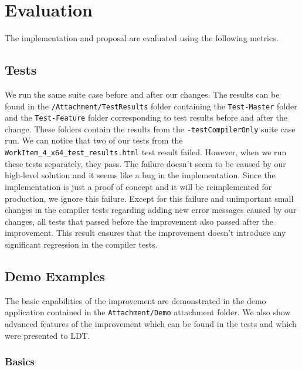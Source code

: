 \chapter{Evaluation}

The implementation and proposal are evaluated using the following metrics.

\section{Tests}

We run the same suite case before and after our changes. 
The results can be found in the \texttt{/Attachment/TestResults} folder containing the \texttt{Test-Master} folder and the \texttt{Test-Feature} folder corresponding to test results before and after the change. 
These folders contain the results from the \texttt{-testCompilerOnly} suite case run.
We can notice that two of our tests from the \texttt{WorkItem\_4\_x64\_test\_results.html} test result failed.
However, when we run these tests separately, they pass.
The failure doesn't seem to be caused by our high-level solution and it seems like a bug in the implementation.
Since the implementation is just a proof of concept and it will be reimplemented for production, we ignore this failure.
Except for this failure and unimportant small changes in the compiler tests regarding adding new error messages caused by our changes, all tests that passed before the improvement also passed after the improvement.
This result ensures that the improvement doesn’t introduce any significant regression in the compiler tests.

\section{Demo Examples}

The basic capabilities of the improvement are demonstrated in the demo application contained in the \texttt{Attachment/Demo} attachment folder. 
We also show advanced features of the improvement which can be found in the tests and which were presented to LDT. 


\subsection{Basics}

